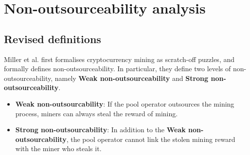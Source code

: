 \section{Non-outsourceability analysis}
\label{sec:non_outsourceability}



\subsection{Revised definitions}

Miller et al. \cite{miller2015nonoutsourceable} first formalises cryptocurrency mining as scratch-off puzzles, and formally defines non-outsourceability.
In particular, they define two levels of non-outsourceability, namely \textbf{Weak non-outsourceability} and \textbf{Strong non-outsourceability}.

\begin{itemize}
    \item \textbf{Weak non-outsourcability}: If the pool operator outsources the mining process, miners can always steal the reward of mining.
    \item \textbf{Strong non-outsourcability}: In addition to the \textbf{Weak non-outsourcability}, the pool operator cannot link the stolen mining reward with the miner who steals it.
\end{itemize}


